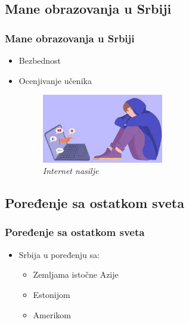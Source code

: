 \documentclass{beamer}
\begin{document}
\subsection{Mane obrazovanja u Srbiji}
\begin{frame}[fragile]\frametitle{Mane obrazovanja u Srbiji}

\begin{itemize}
    \item Bezbednost
    \item Ocenjivanje učenika
    \begin{figure}[h!]
        \centering
        \includegraphics[height=3cm]{internet_nasilje.jpg} 
        \caption{\emph{ Internet nasilje}}
        \label{fig:Bezbednost}
\end{figure}
\end{itemize}

\end{frame}
\subsection{Poređenje sa ostatkom sveta}
\begin{frame}[fragile]\frametitle{Poređenje sa ostatkom sveta}

\begin{itemize}
    \item Srbija u poređenju sa:
    \begin{itemize}
        \item Zemljama istočne Azije
        \item  Estonijom
        \item Amerikom
    \end{itemize}

\end{itemize}

\end{frame}
\end{document}
